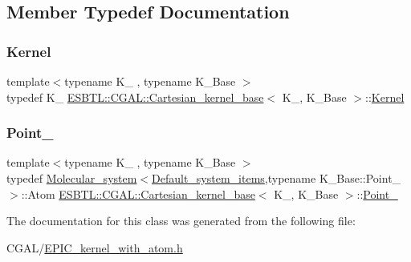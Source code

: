 \subsection{Member Typedef Documentation}
\mbox{\label{classESBTL_1_1CGAL_1_1Cartesian__kernel__base_a281013f75db02ed3c77c1247776c4a00}} 
\subsubsection{\texorpdfstring{Kernel}{Kernel}}
{\footnotesize\ttfamily template$<$typename K\+\_\+ , typename K\+\_\+\+Base $>$ \\
typedef K\+\_\+ \hyperlink{classESBTL_1_1CGAL_1_1Cartesian__kernel__base}{E\+S\+B\+T\+L\+::\+C\+G\+A\+L\+::\+Cartesian\+\_\+kernel\+\_\+base}$<$ K\+\_\+, K\+\_\+\+Base $>$\+::\hyperlink{classESBTL_1_1CGAL_1_1Cartesian__kernel__base_a281013f75db02ed3c77c1247776c4a00}{Kernel}}

\mbox{\label{classESBTL_1_1CGAL_1_1Cartesian__kernel__base_a9a2ac39990666886a8bc8254b608fdac}} 
\subsubsection{\texorpdfstring{Point\+\_}{Point\_3}}
{\footnotesize\ttfamily template$<$typename K\+\_\+ , typename K\+\_\+\+Base $>$ \\
typedef \hyperlink{classESBTL_1_1Molecular__system}{Molecular\+\_\+system}$<$\hyperlink{structESBTL_1_1Default__system__items}{Default\+\_\+system\+\_\+items},typename K\+\_\+\+Base\+::\+Point\+\_ $>$\+::Atom \hyperlink{classESBTL_1_1CGAL_1_1Cartesian__kernel__base}{E\+S\+B\+T\+L\+::\+C\+G\+A\+L\+::\+Cartesian\+\_\+kernel\+\_\+base}$<$ K\+\_\+, K\+\_\+\+Base $>$\+::\hyperlink{classESBTL_1_1CGAL_1_1Cartesian__kernel__base_a9a2ac39990666886a8bc8254b608fdac}{Point\+\_}}



The documentation for this class was generated from the following file\+:\begin{DoxyCompactItemize}
\item 
C\+G\+A\+L/\hyperlink{EPIC__kernel__with__atom_8h}{E\+P\+I\+C\+\_\+kernel\+\_\+with\+\_\+atom.\+h}\end{DoxyCompactItemize}
